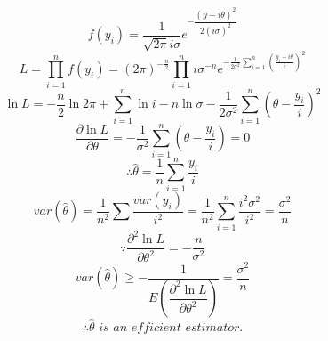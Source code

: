 \[ f\left( y_{i}\right) =\dfrac {1}{\sqrt {2\pi }i\sigma }e^{-\dfrac {\left( y-i\theta \right) ^{2}}{2\left( i\sigma \right) ^{2}}}\]
\[ L=\prod ^{n}_{i=1}f\left( y_{i}\right) =\left( 2\pi \right) ^{-\frac {n}{2}}\prod ^{n}_{i=1}i\sigma ^{-n}e^{-\frac {1}{2\sigma^2}\sum ^{n}_{i=1}\left( \frac {y_{i}-i\theta }{i}\right) ^{2}}\]
\[ \ln L=-\dfrac {n}{2}\ln 2\pi +\sum ^{n}_{i=1}\ln i-n\ln \sigma -\dfrac {1}{2\sigma ^{2}}\sum ^{n}_{i=1}\left( \theta -\dfrac {y_{i}}{i}\right) ^{2} \]
\[ \dfrac {\partial \ln L}{\partial \theta }=-\dfrac {1}{\sigma ^{2}}\sum ^{n}_{i=1}\left( \theta -\dfrac {y_{i}}{i}\right) =0\]
\[\therefore \hat {\theta }=\dfrac {1}{n}\sum ^{n}_{i=1}\dfrac {y_{i}}{i}\]
\[ var\left( \hat {\theta }\right) =\dfrac {1}{n^{2}}\sum \dfrac {var\left( y_{i}\right) }{i^{2}}=\dfrac {1}{n^{2}}\sum ^{n}_{i=1}\dfrac {i^{2}\sigma ^{2}}{i^{2}}=\dfrac{\sigma ^{2}}{n} \]
\[ \because \dfrac {\partial ^{2}\ln L}{\partial \theta ^{2}}=-\dfrac {n}{\sigma ^{2}}\]
\[var\left( \hat {\theta }\right) \geq -\dfrac {1}{E\left( \dfrac {\partial ^{2}\ln L}{\partial \theta ^{2}}\right) }=\dfrac {\sigma ^{2}}{n}\]
\[ \therefore \hat{\theta}\,\, is\,\, an\,\, efficient\,\, estimator.\]
